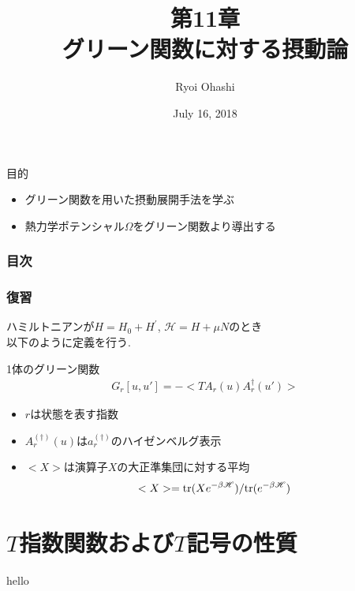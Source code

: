 \documentclass[dvipdfmx,11pt]{beamer}
\title{第11章\\グリーン関数に対する摂動論}
\author{Ryoi Ohashi}
\date{July 16, 2018}
\institute{Department of Applied Physics, Nagoya University}
\begin{document}
\begin{frame}[plain]
    \maketitle
\end{frame}

\begin{frame}{目的}
    \begin{itemize}
        \item グリーン関数を用いた摂動展開手法を学ぶ
        \item 熱力学ポテンシャル$\Omega$をグリーン関数より導出する
    \end{itemize}
\end{frame}

\begin{frame}\frametitle{目次}
    \setcounter{tocdepth}{1}
    \tableofcontents
\end{frame}

\begin{frame}\frametitle{復習}
    ハミルトニアンが$H=H_0+H^{'}$, $\mathscr{H}=H+\mu N$のとき\\
    以下のように定義を行う.
    \begin{block}{1体のグリーン関数}
        \begin{align}
            G_r[u,u'] = -<TA_r(u)A_r^{\dagger}(u')>
        \end{align}
    \end{block}
    \setcounter{equation}{2}
    \begin{itemize}
        \item $r$は状態を表す指数\\
        \item $A_r^{(\dagger)}(u)$は$a_r^{(\dagger)}$のハイゼンベルグ表示\\
        \item $<X>$は演算子$X$の大正準集団に対する平均\\
        \begin{align}
            <X>={\rm tr}(X e^{-\beta\mathscr{H}})/{\rm tr}(e^{-\beta\mathscr{H}})
        \end{align}
        
    \end{itemize}
\end{frame}

\section{$T$指数関数および$T$記号の性質}
\begin{frame}
    hello
\end{frame}
\end{document}
